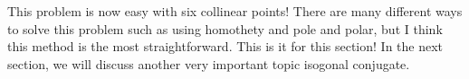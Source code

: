 \documentclass[../../../main.tex]{subfiles}
\begin{document}
This problem is now easy with six collinear points! There are many
different ways to solve this problem such as using homothety
and pole and polar, but I think this method is the most
straightforward. This is it for this section! In the next section,
we will discuss another very important topic isogonal conjugate.
\end{document}

